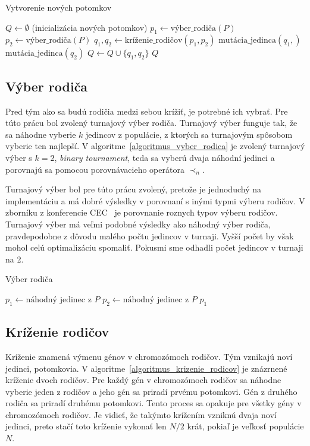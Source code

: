 \vspace*{\dimexpr0.5\baselineskip\relax}
\begin{algorithm}[h]\label{algoritmus_vytvorenie_novych_potomkov}
\caption{Vytvorenie nových potomkov}
  $Q \gets \emptyset$ (inicializácia nových potomkov)\;
   {
    $p_1 \gets \text{výber\_rodiča}(P)$\;
    $p_2 \gets \text{výber\_rodiča}(P)$\;
    $q_1, q_2 \gets \text{kríženie\_rodičov}(p_1, p_2)$\;
    $\text{mutácia\_jedinca}(q_1,)$\;
    $\text{mutácia\_jedinca}(q_2)$\;
    $Q \gets Q \cup \{q_1, q_2\}$\;
  }
  \Return $Q$\;
\end{algorithm}

\subsection*{Výber rodiča}
Pred tým ako sa budú rodičia medzi sebou krížiť, je potrebné ich vybrať.
Pre túto prácu bol zvolený turnajový výber rodiča.
Turnajový výber funguje tak, že sa náhodne vyberie $k$ jedincov z populácie, z ktorých sa turnajovým spôsobom vyberie ten najlepší.
V algoritme~\ref{algoritmus_vyber_rodica} je zvolený turnajový výber s $k = 2$, \textit{binary tournament}, teda sa vyberú dvaja náhodní jedinci a porovnajú sa pomocou porovnávacieho operátora $\prec_n$.

Turnajový výber bol pre túto prácu zvolený, pretože je jednoduchý na implementáciu a má dobré výsledky v porovnaní s inými typmi výberu rodičov.
V zborníku z konferencie CEC~\cite{farias2018parent} je porovnanie roznych typov výberu rodičov.
Turnajový výber má veľmi podobné výsledky ako náhodný výber rodiča, pravdepodobne z dôvodu malého počtu jedincov v turnaji.
Vyšší počet by však mohol celú optimalizáciu spomaliť.
Pokusmi sme odhadli počet jedincov v turnaji na 2.

\vspace*{\dimexpr0.5\baselineskip\relax}
\begin{algorithm}[h]\label{algoritmus_vyber_rodica}
\caption{Výber rodiča}
  $p_1 \gets \text{náhodný jedinec z } P$\;
  $p_2 \gets \text{náhodný jedinec z } P$\;
   {
    \Return $p_1$\;
  }
\end{algorithm}

\subsection*{Kríženie rodičov}
Kríženie znamená výmenu génov v chromozómoch rodičov.
Tým vznikajú noví jedinci, potomkovia.
V algoritme~\ref{algoritmus_krizenie_rodicov} je znázrnené kríženie dvoch rodičov.
Pre každý gén v chromozómoch rodičov sa náhodne vyberie jeden z rodičov a jeho gén sa priradí prvému potomkovi.
Gén z druhého rodiča sa priradí druhému potomkovi.
Tento proces sa opakuje pre všetky gény v chromozómoch rodičov.
Je vidieť, že takýmto krížením vzniknú dvaja noví jedinci, preto stačí toto kríženie vykonať len $N/2$ krát, pokiaľ je veľkosť populácie $N$.

